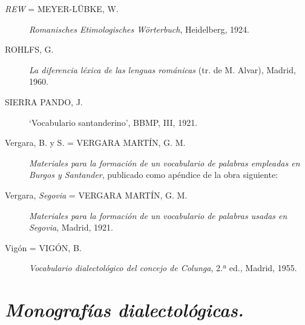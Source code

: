 \documentclass[11pt,spanish,b5paper]{book}
\begin{document}
\begin{description}
\item[\textit{REW} = MEYER-LÜBKE, W.] \textit{Romanisches Etimologisches Wörterbuch}, Heidelberg, 1924. 
\item[ROHLFS, G.] \textit{La diferencia léxica de las lenguas románicas} (tr. de M. Alvar), Madrid, 1960. 
\item[SIERRA PANDO, J.] `Vocabulario santanderino', BBMP, III, 1921.  
\item[Vergara, B. y S. = VERGARA MARTÍN, G. M.] \textit{Materiales para la formación de un vocabulario de palabras empleadas en Burgos y Santander}, publicado como apéndice de la obra siguiente: 
\item[Vergara, \textit{Segovia} = VERGARA MARTÍN, G. M.] \textit{Materiales para la formación de un vocabulario de palabras usadas en Segovia}, Madrid, 1921.
\item[Vigón = VIGÓN, B.] \textit{Vocabulario dialectológico del concejo de Colunga}, 2.ª ed., Madrid, 1955.
\end{description}


\section{\emph{Monografías dialectológicas.}}
\end{document}

